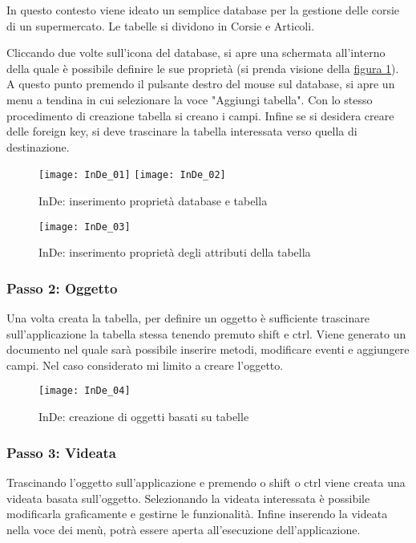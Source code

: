 In questo contesto viene ideato un semplice database per la gestione delle corsie di un supermercato. Le tabelle si dividono in Corsie e Articoli.

Cliccando due volte sull'icona del database, si apre una schermata all'interno della quale è possibile definire le sue proprietà (si prenda visione della \hyperref[InDe_Db_proprietà db_t]{figura \ref{InDe_Db_proprietà db_t}}). A questo punto premendo il pulsante destro del mouse sul database, si apre un menu a tendina in cui selezionare la voce "Aggiungi tabella". Con lo stesso procedimento di creazione tabella si creano i campi.
Infine se si desidera creare delle foreign key, si deve trascinare la tabella interessata verso quella di destinazione.  

\begin{figure}[!h] 
	\centering 
	\texttt{[image: InDe\_01]} 
	\texttt{[image: InDe\_02]} 
	\caption{InDe: inserimento proprietà database e tabella}
	\label{InDe_Db_proprietà db_t}
\end{figure}

\begin{figure}[!h] 
	\centering  
	\texttt{[image: InDe\_03]} 
	\caption{InDe: inserimento proprietà degli attributi della tabella}
	\label{InDe_Db_proprietà_a}
\end{figure}


\subsubsection{Passo 2: Oggetto}
Una volta creata la tabella, per definire un oggetto è sufficiente trascinare sull'applicazione la tabella stessa tenendo premuto shift e ctrl. Viene generato un documento nel quale sarà possibile inserire metodi, modificare eventi e aggiungere campi. Nel caso considerato mi limito a creare l'oggetto.

\begin{figure}[!h] 
	\centering  
	\texttt{[image: InDe\_04]} 
	\caption{InDe: creazione di oggetti basati su tabelle}
	\label{InDe_Oggetti}
\end{figure}

\subsubsection{Passo 3: Videata}
Trascinando l'oggetto sull'applicazione e premendo o shift o ctrl viene creata una videata basata sull'oggetto. Selezionando la videata interessata è possibile modificarla graficamente e gestirne le funzionalità. Infine inserendo la videata nella voce dei menù, potrà essere aperta all'esecuzione dell'applicazione.

